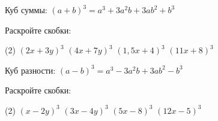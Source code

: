 %
%

\begin{class}[number=1]
	\begin{definit}
		Куб суммы: \( (a+b)^3=a^3+3a^2b+3ab^2+b^3 \)
	\end{definit}
	\begin{listofex}
		\item Раскройте скобки:
		\begin{tasks}(2)
			\task \( (2x+3y)^3 \)
			\task \( (4x+7y)^3 \)
			\task \( (1,5x+4)^3 \)
			\task \( (11x+8)^3 \)
		\end{tasks}
	\end{listofex}
		\begin{definit}
			Куб разности: \( (a-b)^3=a^3-3a^2b+3ab^2-b^3 \)
		\end{definit}
	\begin{listofex}[resume]
		\item Раскройте скобки:
		\begin{tasks}(2)
			\task \( (x-2y)^3 \)
			\task \( (3x-4y)^3 \)
			\task \( (5x-8)^3 \)
			\task \( (12x-5)^3 \)
		\end{tasks}
		

\end{listofex}
\end{class}
